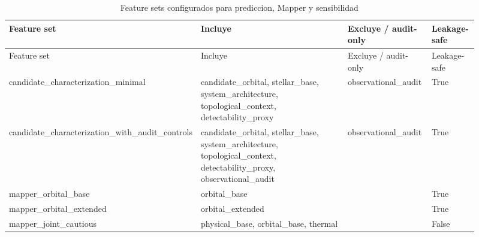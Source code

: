 \begin{longtable}{p{0.27\linewidth}p{0.36\linewidth}p{0.18\linewidth}p{0.10\linewidth}}
\caption{Feature sets configurados para prediccion, Mapper y sensibilidad}\label{tab:feature-sets}\\
\toprule
Feature set & Incluye & Excluye / audit-only & Leakage-safe \\
\midrule
\endfirsthead
\toprule
Feature set & Incluye & Excluye / audit-only & Leakage-safe \\
\midrule
\endhead
candidate\_characterization\_minimal & candidate\_orbital, stellar\_base, system\_architecture, topological\_context, detectability\_proxy & observational\_audit & True \\
candidate\_characterization\_with\_audit\_controls & candidate\_orbital, stellar\_base, system\_architecture, topological\_context, detectability\_proxy, observational\_audit & observational\_audit & True \\
mapper\_orbital\_base & orbital\_base &  & True \\
mapper\_orbital\_extended & orbital\_extended &  & True \\
mapper\_joint\_cautious & physical\_base, orbital\_base, thermal &  & False \\
\bottomrule
\end{longtable}
